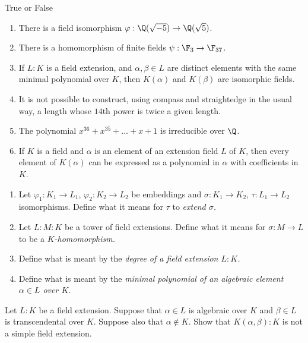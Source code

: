 \documentclass{article}
\begin{document}
\setcounter{section}{1}

 True or False
\begin{enumerate}[label=(\alph*)]
  \item There is a field isomorphism \( \varphi : \Q(\sqrt{-5}) \to \Q(\sqrt{5}) \).
  \item There is a homomorphism of finite fields \( \psi : \F_3 \to \F_{37} \).
  \item If \( L : K \) is a field extension, and \( \alpha, \beta \in L \) are distinct elements with the same minimal polynomial over \( K \), then \( K(\alpha) \) and \( K(\beta) \) are isomorphic fields.
  \item It is not possible to construct, using compass and straightedge in the usual way, a length whose \(14\)th power is twice a given length.
  \item The polynomial \( x^{36} + x^{35} + \dots + x + 1 \) is irreducible over \( \Q \).
  \item If \( K \) is a field and \( \alpha \) is an element of an extension field \( L \) of \( K \), then every element of \( K(\alpha) \) can be expressed as a polynomial in \( \alpha \) with coefficients in \( K \).
\end{enumerate}


\begin{enumerate}[label=(\alph*)]
  \item Let \( \varphi_1 : K_1 \to L_1 \), \( \varphi_2 : K_2 \to L_2 \) be embeddings and \( \sigma : K_1 \to K_2 \), \( \tau : L_1 \to L_2 \) isomorphisms. Define what it means for \( \tau \) to \it{extend} \( \sigma \).
  \item Let \( L : M : K \) be a tower of field extensions. Define what it means for \( \sigma : M \to L \) to be a \it{\( K \)-homomorphism}.
  \item Define what is meant by the \it{degree} of a field extension \( L : K \).
  \item Define what is meant by the \it{minimal polynomial} of an algebraic element \( \alpha \in L \) over \( K \).
\end{enumerate}

 Let \( L : K \) be a field extension. Suppose that \( \alpha \in L \) is algebraic over \( K \) and \( \beta \in L \) is transcendental over \( K \). Suppose also that \( \alpha \notin K \). Show that \( K(\alpha, \beta) : K \) is not a simple field extension.
\end{document}
